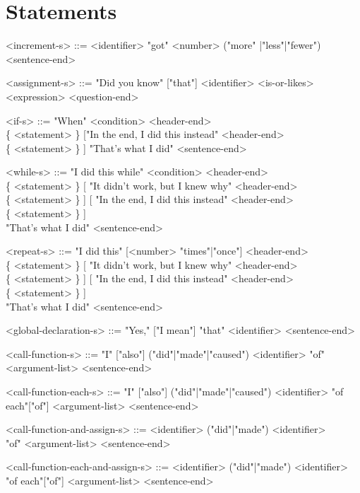 \documentclass[12pt,a4paper]{article}
\begin{document}
\section{Statements}

\begin{grammar}

<increment-s> ::= <identifier> "got" <number> ("more" |"less"|"fewer") <sentence-end>

<assignment-s> ::= "Did you know" ["that"] <identifier> <is-or-likes> <expression> <question-end>

<if-s> ::= "When" <condition> <header-end> \\ \{ <statement> \} 
  ["In the end, I did this instead" <header-end> \\ \{ <statement> \} ]
  "That's what I did" <sentence-end>

<while-s> ::= "I did this while" <condition> <header-end> \\
  \{ <statement> \}
  [ "It didn't work, but I knew why" <header-end> \\ \{ <statement> \} ]
  [ "In the end, I did this instead" <header-end> \\ \{ <statement> \} ]\\
  "That's what I did" <sentence-end>
  
<repeat-s> ::= "I did this" [<number> "times"|"once"]  <header-end>\\
  \{ <statement> \} 
  [ "It didn't work, but I knew why" <header-end> \\ \{ <statement> \} ]
  [ "In the end, I did this instead" <header-end> \\ \{ <statement> \} ]\\
  "That's what I did" <sentence-end>

<global-declaration-s> ::= "Yes," ["I mean"] "that" <identifier> <sentence-end>

<call-function-s> ::= "I" ["also"] ("did"|"made"|"caused") <identifier> "of" <argument-list> <sentence-end>

<call-function-each-s> ::= "I" ["also"] ("did"|"made"|"caused") <identifier> "of each"["of"] <argument-list> <sentence-end>

<call-function-and-assign-s> ::= <identifier> ("did"|"made") <identifier>\\"of" <argument-list> <sentence-end>

<call-function-each-and-assign-s> ::= <identifier> ("did"|"made") <identifier>\\"of each"["of"] <argument-list> <sentence-end>


\end{grammar}
\end{document}
